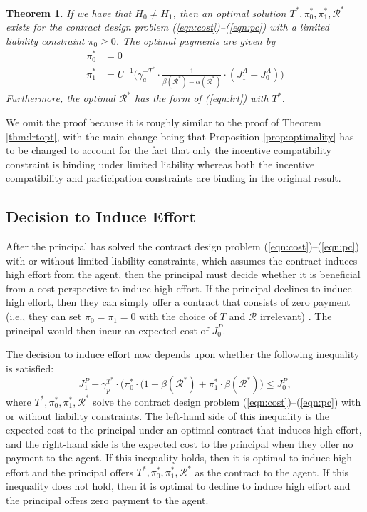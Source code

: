 \documentclass[letterpaper, 10 pt, conference]{ieeeconf}  %
\newtheorem{theorem}{Theorem}
\begin{document}
\begin{theorem}
\label{thm:lrtopt_ll}
If we have that $H_0 \neq H_1$, then an optimal solution $T^*, \pi_0^*, \pi_1^*, \mathcal{R}^*$ exists for the contract design problem (\ref{eqn:cost})--(\ref{eqn:pc}) with a limited liability constraint $\pi_0 \geq 0$. The optimal payments are given by
\begin{align}
\pi_0^* &= 0\\
\pi_1^* &= \textstyle U^{-1}\Big(\gamma_a^{-T^*}\cdot\frac{1}{\beta(\mathcal{R}^*) - \alpha(\mathcal{R}^*)}\cdot(J_1^A-J_0^A)\Big)\label{eqn:pi1star_ll}
\end{align}
Furthermore, the optimal $\mathcal{R}^*$ has the form of (\ref{eqn:lrt}) with $T^*$.
\end{theorem}

We omit the proof because it is roughly similar to the proof of Theorem \ref{thm:lrtopt}, with the main change being that Proposition \ref{prop:optimality} has to be changed to account for the fact that only the incentive compatibility constraint is binding under limited liability whereas both the incentive compatibility and participation constraints are binding in the original result.

\subsection{Decision to Induce Effort}
\label{sec:dieff}

After the principal has solved the contract design problem (\ref{eqn:cost})--(\ref{eqn:pc}) with or without limited liability constraints, which assumes the contract induces high effort from the agent, then the principal must decide whether it is beneficial from a cost perspective to induce high effort. If the principal declines to induce high effort, then they can simply offer a contract that consists of zero payment (i.e., they can set $\pi_0 = \pi_1 = 0$ with the choice of $T$ and $\mathcal{R}$ irrelevant) \cite{Laffont}. The principal would then incur an expected cost of $J^P_0$. 

The decision to induce effort now depends upon whether the following inequality is satisfied:
\begin{equation}
\label{eqn:eqndieff}
    J_1^P + \gamma_p^{T^*} \cdot \big(\pi_0^* \cdot (1-\beta(\mathcal{R}^*) + \pi_1^* \cdot \beta(\mathcal{R}^*)\big) \leq J_0^P,
\end{equation}
where $T^*,\pi_0^*,\pi_1^*,\mathcal{R}^*$ solve the contract design problem (\ref{eqn:cost})--(\ref{eqn:pc}) with or without liability constraints. The left-hand side of this inequality is the expected cost to the principal under an optimal contract that induces high effort, and the right-hand side is the expected cost to the principal when they offer no payment to the agent. If this inequality holds, then it is optimal to induce high effort and the principal offers $T^*,\pi_0^*,\pi_1^*,\mathcal{R}^*$ as the contract to the agent. If this inequality does not hold, then it is optimal to decline to induce high effort and the principal offers zero payment to the agent.
\end{document}
